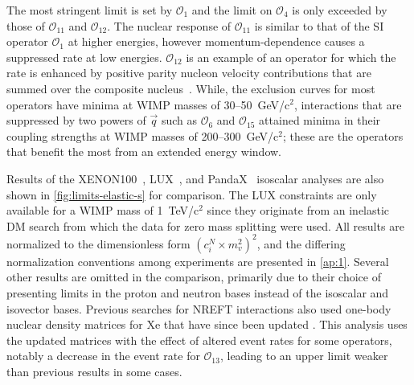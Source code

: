 \documentclass[reprint, showpacs,
preprintnumbers,
amsmath,amssymb,
aps, floatfix,
superscriptaddress,
prd, nofootinbib]{revtex4-1}
\begin{document}
The most stringent limit is set by $\mathcal{O}_1$ and the limit on $\mathcal{O}_4$ is only exceeded by those of $\mathcal{O}_{11}$ and $\mathcal{O}_{12}$. 
The nuclear response of $\mathcal{O}_{11}$ is similar to that of the SI operator $\mathcal{O}_1$ at higher energies, however momentum-dependence causes a suppressed rate at low energies. 
$\mathcal{O}_{12}$ is an example of an operator for which the rate is enhanced by positive parity nucleon velocity contributions that are summed over the composite nucleus~\cite{Anand:MathematicaEFT}. 
While, the exclusion curves for most operators have minima at WIMP masses of 30--50~GeV/c$^2$, interactions that are suppressed by two powers of $\vec{q}$ such as $\mathcal{O}_6$ and $\mathcal{O}_{15}$ attained minima in their coupling strengths at WIMP masses of 200--300~GeV/c$^2$; these are the operators that benefit the most from an extended energy window.
\par
Results of the XENON100~\cite{Xenon100:EFT_2017}, LUX~\cite{LUX:EFTR4_2021}, and PandaX~\cite{PandaX2:SD_EFT_2019} isoscalar analyses are also shown in \autoref{fig:limits-elastic-s} for comparison. 
The LUX constraints are only available for a WIMP mass of 1~TeV/c$^2$ since they originate from an inelastic DM search from which the data for zero mass splitting were used.
All results are normalized to the dimensionless form $(c_i^N \times m_v^2)^2$, and the differing normalization conventions among experiments are presented in \cref{ap:1}. 
Several other results are omitted in the comparison, primarily due to their choice of presenting limits in the proton and neutron bases instead of the isoscalar and isovector bases.
Previous searches for NREFT interactions also used one-body nuclear density matrices for Xe that have since been updated \cite{Haxton_OneBody}. 
This analysis uses the updated matrices with the effect of altered event rates for some operators, notably a decrease in the event rate for $\mathcal{O}_{13}$, leading to an upper limit weaker than previous results in some cases. 
\end{document}
